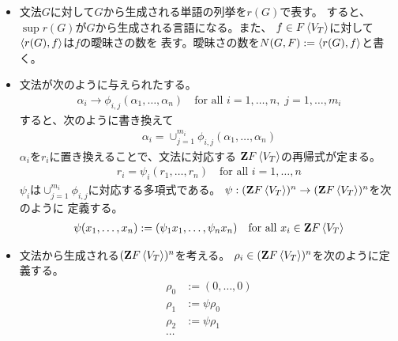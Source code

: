 {\begin{itemize}
\begin{equation*}
\begin{split}
			r_1 \equiv r_2 (\bmod \deg n) \xiff{\dfn} 
			\braket{r_1,f} = \braket{r_2,f} \quad\text{for all } |f|\le n
		\end{split}\end{equation*}
		\item 文法$G$に対して$G$から生成される単語の列挙を$r(G)$で表す。
		すると、$\sup r(G)$が$G$から生成される言語になる。また、
		$f\in F\mathinner{\langle{V_T}\rangle}$に対して$\mathinner{\langle{r(G),f}\rangle}$は$f$の曖昧さの数を
		表す。曖昧さの数を$N(G,F):=\mathinner{\langle{r(G),f}\rangle}$と書く。
		\item 文法が次のように与えられたする。
		\begin{equation*}\begin{split}
			\alpha_i \to \phi_{i,j}(\alpha_1,\dots,\alpha_n)
			\quad\text{for all } i=1,\dots,n,\; j=1,\dots,m_i
		\end{split}\end{equation*}
		すると、次のように書き換えて
		\begin{equation*}\begin{split}
			\alpha_i = \cup_{j=1}^{m_i} \phi_{i,j}(\alpha_1,\dots,\alpha_n)
		\end{split}\end{equation*}
		$\alpha_i$を$r_i$に置き換えることで、文法に対応する
		$\mathbf{Z} F\mathinner{\langle{V_T}\rangle}$の再帰式が定まる。
		\begin{equation*}\begin{split}
			r_i = \psi_i(r_1,\dots,r_n) \quad\text{for all } i=1,\dots,n
		\end{split}\end{equation*}
		$\psi_i$は$\cup_{j=1}^{m_i} \phi_{i,j}$に対応する多項式である。
		$\psi:(\mathbf{Z} F\mathinner{\langle{V_T}\rangle})^n\to(\mathbf{Z} F\mathinner{\langle{V_T}\rangle})^n$を次のように
		定義する。
		\begin{equation*}\begin{split}
			\psi (x_1,\dots,x_n) := (\psi_1x_1,\dots,\psi_nx_n)
			\quad\text{for all } x_i\in \mathbf{Z} F\mathinner{\langle{V_T}\rangle}
		\end{split}\end{equation*}
		\item 文法から生成される$(\mathbf{Z} F\mathinner{\langle{V_T}\rangle})^n$を考える。
		$\rho_i\in(\mathbf{Z} F\mathinner{\langle{V_T}\rangle})^n$を次のように定義する。
		\begin{equation*}\begin{split}
			\rho_0 &:= (0,\dots,0) \\
			\rho_1 &:= \psi\rho_0 \\
			\rho_2 &:= \psi\rho_1 \\
			\cdots \\

\end{split}
\end{equation*}
\end{itemize}}
